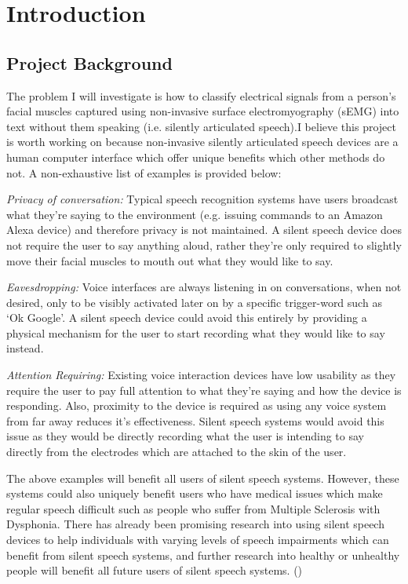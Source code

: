\chapter{Introduction} \label{chap:intro}

\section{Project Background}

The problem I will investigate is how to classify electrical signals from a person's facial
muscles captured using non-invasive surface electromyography (sEMG) into text without
them speaking (i.e. silently articulated speech).I believe this project is worth working on
because non-invasive silently articulated speech devices are a human computer interface
which offer unique benefits which other methods do not. A non-exhaustive list of examples
is provided below:

\emph{Privacy of conversation:} Typical speech recognition systems have users broadcast
what they're saying to the environment (e.g. issuing commands to an Amazon Alexa
device) and therefore privacy is not maintained. A silent speech device does not require the
user to say anything aloud, rather they're only required to slightly move their facial muscles
to mouth out what they would like to say.

\emph{Eavesdropping:} Voice interfaces are always listening in on conversations, when not
desired, only to be visibly activated later on by a specific trigger-word such as ‘Ok Google'.
A silent speech device could avoid this entirely by providing a physical mechanism for the
user to start recording what they would like to say instead.

\emph{Attention Requiring:} Existing voice interaction devices have low usability as they
require the user to pay full attention to what they're saying and how the device is
responding. Also, proximity to the device is required as using any voice system from far
away reduces it's effectiveness. Silent speech systems would avoid this issue as they
would be directly recording what the user is intending to say directly from the electrodes
which are attached to the skin of the user.

The above examples will benefit all users of silent speech systems. However, these
systems could also uniquely benefit users who have medical issues which make regular
speech difficult such as people who suffer from Multiple Sclerosis with Dysphonia. There
has already been promising research into using silent speech devices to help individuals
with varying levels of speech impairments which can benefit from silent speech systems,
and further research into healthy or unhealthy people will benefit all future users of silent
speech systems.
(\cite{pmlr-v116-kapur20a})

